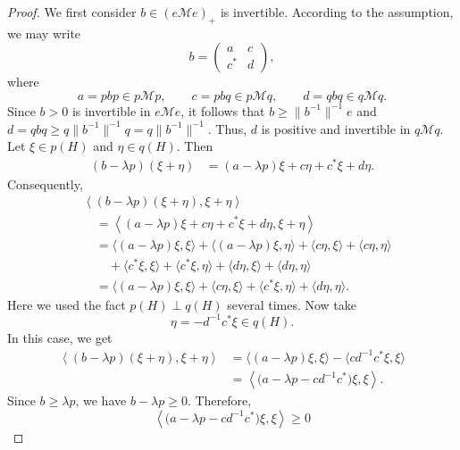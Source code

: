 \documentclass[11]{amsart}
\numberwithin{equation}{section}
\begin{document}
\begin{proof}
We first consider  $b\in(e\mathcal Me)_+$ is  invertible.	According to the assumption, we may write 
	\begin{equation}\label{eq:b-block}
		b=\begin{pmatrix}a&c\\c^*&d\end{pmatrix},
	\end{equation}
	where 	
	\[
	a=pbp\in p\mathcal Mp,
	\qquad c=pbq\in p\mathcal Mq,
	\qquad d=qbq\in q\mathcal Mq.
	\]
	Since $b>0$ is invertible in $e\mathcal Me$,  it follows that $b\geq \|b^{-1}\|^{-1}e$ and  $d=qbq\geq q\|b^{-1}\|^{-1}q=q\|b^{-1}\|^{-1}$. Thus, $d$ is positive and invertible in
	$q\mathcal Mq$.
Let $\xi\in p(H)$ and $\eta\in q(H)$. Then
\[
\begin{aligned}
	(b-\lambda p)(\xi+\eta)
	&=(a-\lambda p)\xi+c\eta+c^*\xi+d\eta.
\end{aligned}
\]
Consequently,
\begin{align*}
	&\left\langle
	(b-\lambda p)(\xi+\eta),\xi+\eta
	\right\rangle                                                     \\
	&\quad=
	\left\langle
	(a-\lambda p)\xi+c\eta+c^*\xi+d\eta,\xi+\eta
	\right\rangle                                                     \\
	&\quad=
	\langle(a-\lambda p)\xi,\xi\rangle
	+\langle(a-\lambda p)\xi,\eta\rangle
	+\langle c\eta,\xi\rangle
	+\langle c\eta,\eta\rangle                                       \\
	&\qquad
	+\langle c^*\xi,\xi\rangle
	+\langle c^*\xi,\eta\rangle
	+\langle d\eta,\xi\rangle
	+\langle d\eta,\eta\rangle                  \\
	&\quad=
	\langle(a-\lambda p)\xi,\xi\rangle
	+\langle c\eta,\xi\rangle 
	+\langle c^*\xi,\eta\rangle
	+\langle d\eta,\eta\rangle.
\end{align*}
Here we used the fact $p(H)\perp q(H)$ several times. 
Now take
\[
\eta=-d^{-1}c^*\xi\in q(H).
\]
In this case, we get 
\begin{align*}
	\left\langle
	(b-\lambda p)(\xi+\eta),\xi+\eta
	\right\rangle             &= 	\langle(a-\lambda p)\xi,\xi\rangle
	-\langle cd^{-1}c^*\xi,\xi\rangle \\
	&=	\left\langle
	\bigl(a-\lambda p-cd^{-1}c^*\bigr)\xi,\xi
	\right\rangle. 
\end{align*}
Since $b\geq\lambda p$, we have $b-\lambda p\geq0$. Therefore,
\[
\left\langle
\bigl(a-\lambda p-cd^{-1}c^*\bigr)\xi,\xi
\right\rangle\geq0
\]
\end{proof}
\end{document}
